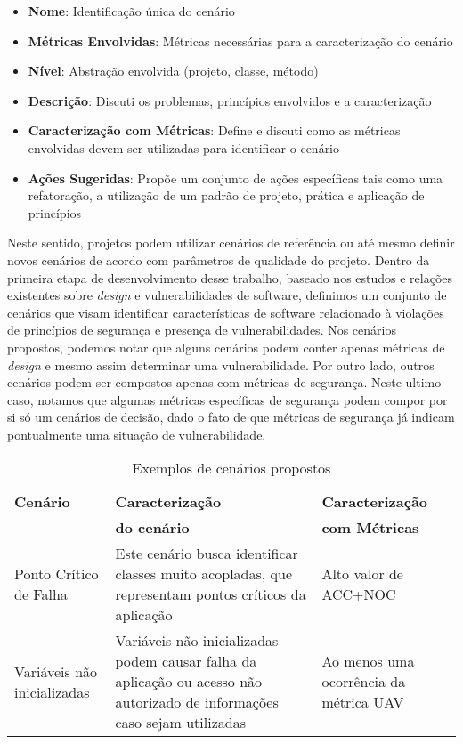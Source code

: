 \begin{itemize}
\item \textbf{Nome}: Identificação única do cenário
\item \textbf{Métricas Envolvidas}: Métricas necessárias para a caracterização do cenário
\item \textbf{Nível}: Abstração envolvida (projeto, classe, método)
\item \textbf{Descrição}: Discuti os problemas, princípios envolvidos e a caracterização
\item \textbf{Caracterização com Métricas}: Define e discuti como as métricas envolvidas devem ser utilizadas para identificar o cenário
\item \textbf{Ações Sugeridas}: Propõe um conjunto de ações específicas tais como uma refatoração, a utilização de um padrão de projeto, prática e aplicação de princípios
\end{itemize}


Neste sentido, projetos podem utilizar cenários de referência ou até mesmo definir novos cenários de acordo com parâmetros de qualidade do projeto. Dentro da primeira etapa de desenvolvimento desse trabalho, baseado nos estudos e relações existentes sobre \emph{design} e vulnerabilidades de software, definimos um conjunto de cenários que visam identificar características de software relacionado à violações de princípios de segurança e presença de vulnerabilidades. Nos cenários propostos, podemos notar que alguns cenários podem conter apenas métricas de \emph{design} e mesmo assim determinar uma vulnerabilidade. Por outro lado, outros cenários podem ser compostos apenas com métricas de segurança. Neste ultimo caso, notamos que algumas métricas específicas de segurança podem compor por si só um cenários de decisão, dado o fato de que métricas de segurança já indicam pontualmente uma situação de vulnerabilidade.

	\begin{table}[H]
		\begin{center}
	    \begin{tabular}{ |p{2cm}| p{3cm} | p{2cm} |}
	    \hline
	    \textbf{Cenário} & \textbf{Caracterização} & \textbf{Caracterização} \\
	      & \textbf{do cenário}  & \textbf{com Métricas}  \\ 	\hline
	    
	    Ponto Crítico de Falha & Este cenário busca identificar classes muito acopladas, que representam pontos críticos da aplicação & Alto valor de ACC+NOC \\
	 \hline
	    Variáveis não inicializadas  & Variáveis não inicializadas podem causar falha da aplicação ou acesso não autorizado de informações caso sejam utilizadas & Ao menos uma ocorrência da métrica UAV  \\ \hline

	    \end{tabular}
		    \caption{Exemplos de cenários propostos}
		    \label{tab:resumo2}
		\end{center}
	\end{table}

